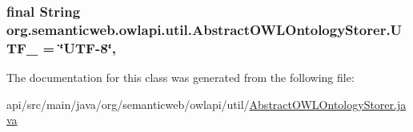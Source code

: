 \hypertarget{classorg_1_1semanticweb_1_1owlapi_1_1util_1_1_abstract_o_w_l_ontology_storer_a783a9f7be00945c4dc263789f0cdae16}{
\subsubsection[{U\-T\-F\-\_\-8}]{\setlength{\rightskip}{0pt plus 5cm}final String org.\-semanticweb.\-owlapi.\-util.\-Abstract\-O\-W\-L\-Ontology\-Storer.\-U\-T\-F\-\_ = \char`\"{}U\-T\-F-\/8\char`\"{}\hspace{0.3cm}{\ttfamily [static]}, {\ttfamily [private]}}}\label{classorg_1_1semanticweb_1_1owlapi_1_1util_1_1_abstract_o_w_l_ontology_storer_a783a9f7be00945c4dc263789f0cdae16}


The documentation for this class was generated from the following file\-:\begin{DoxyCompactItemize}
\item 
api/src/main/java/org/semanticweb/owlapi/util/\hyperlink{_abstract_o_w_l_ontology_storer_8java}{Abstract\-O\-W\-L\-Ontology\-Storer.\-java}\end{DoxyCompactItemize}
